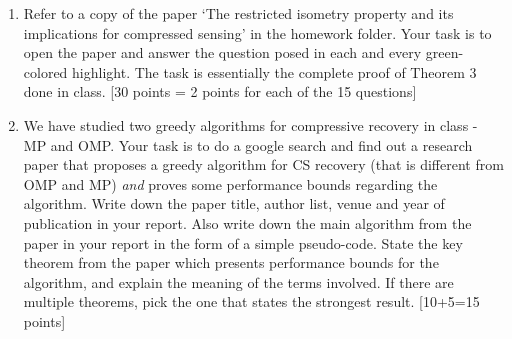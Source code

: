 \documentclass[11pt]{article}
\begin{document}
\begin{enumerate}
\item Refer to a copy of the paper `The restricted isometry property and its implications for compressed sensing' in the homework folder. Your task is to open the paper and answer the question posed in each and every green-colored highlight. The task is essentially the complete proof of Theorem 3 done in class. \textsf{[30 points = 2 points for each of the 15 questions]}

\item We have studied two greedy algorithms for compressive recovery in class - MP and OMP. Your task is to do a google search and find out a research paper that proposes a greedy algorithm for CS recovery (that is different from OMP and MP) \emph{and} proves some performance bounds regarding the algorithm. Write down the paper title, author list, venue and year of publication in your report. Also write down the main algorithm from the paper in your report in the form of a simple pseudo-code. State the key theorem from the paper which presents performance bounds for the algorithm, and explain the meaning of the terms involved. If there are multiple theorems, pick the one that states the strongest result. \textsf{[10+5=15 points]}

\end{enumerate}
\end{document}
